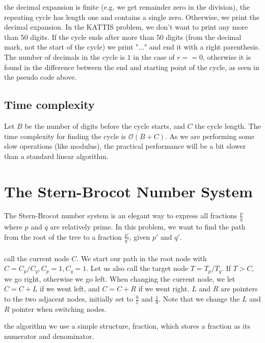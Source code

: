 \documentclass[11pt,a4paper,twoside]{article}
\begin{document}
       
 the decimal expansion is finite (e.g. we get remainder zero in
the division), the repeating cycle has length one and contains a single zero.
Otherwise, we print the decimal expansion. In the KATTIS problem, we don't want
to print any more than $50$ digits. If the cycle ends after more than $50$
digits (from the decimal mark, not the start of the cycle) we print "..." and
end it with a right parenthesis. The number of decimals in the cycle is $1$ in
the case of $r==0$, otherwise it is found in the difference between the end and
starting point of the cycle, as seen in the pseudo code above.

\subsection{Time complexity}
Let $B$ be the number of digits before the cycle starts, and $C$ the cycle
length. The time complexity for finding the cycle is $\mathcal{O}(B+C)$. As we
are performing some slow operations (like modulus), the practical performance
will be a bit slower than a standard linear algorithm.

\section{The Stern-Brocot Number System}

The Stern-Brocot number system is an elegant way to express all fractions
$\frac{p}{q}$ where $p$ and $q$ are relatively prime. In this problem, we want
to find the path from the root of the tree to a fraction $\frac{p'}{q'}$, given
$p'$ and $q'$. 
\\\\
 call the current node $C$. We start our path in the root node
with $C = C_{p}/C_{q}, C_{p} = 1, C_{q} = 1$. Let us also call the target node
$T = T_{p}/T_{q}$. If $T > C$, we go right, otherwise we go left. When changing
the current node, we let $C = C + L$ if we went left, and $C = C + R$ if we
went right. $L$ and $R$ are pointers to the two adjacent nodes, initially set
to $\frac{0}{1}$ and $\frac{1}{0}$. Note that we change the $L$ and $R$ pointer
when switching nodes.


 the algorithm we use a simple structure, fraction, which stores a
fraction as its numerator and denominator.
\end{document}
